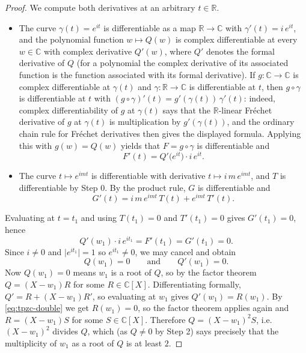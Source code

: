 \begin{proof}
We compute both derivatives at an arbitrary $t\in\mathbb{R}$.
\begin{itemize}
\item The curve $\gamma(t)=e^{it}$ is differentiable as a map
$\mathbb{R}\to\mathbb{C}$ with $\gamma'(t)=i\,e^{it}$, and the polynomial
function $w\mapsto Q(w)$ is complex differentiable at every $w\in\mathbb{C}$
with complex derivative $Q'(w)$, where $Q'$ denotes the formal derivative of
$Q$ (for a polynomial the complex derivative of its associated function is the
function associated with its formal derivative). If $g:\mathbb{C}\to\mathbb{C}$
is complex differentiable at $\gamma(t)$ and $\gamma:\mathbb{R}\to\mathbb{C}$ is
differentiable at $t$, then $g\circ\gamma$ is differentiable at $t$ with
$(g\circ\gamma)'(t)=g'(\gamma(t))\,\gamma'(t)$: indeed, complex
differentiability of $g$ at $\gamma(t)$ says that the $\mathbb{R}$-linear
Fr\'echet derivative of $g$ at $\gamma(t)$ is multiplication by $g'(\gamma(t))$,
and the ordinary chain rule for Fr\'echet derivatives then gives the displayed
formula. Applying this with $g(w)=Q(w)$ yields that $F=g\circ\gamma$ is
differentiable and
\[
  F'(t)=Q'\bigl(e^{it}\bigr)\cdot i\,e^{it}.
\]
\item The curve $t\mapsto e^{imt}$ is differentiable with derivative
$t\mapsto i\,m\,e^{imt}$, and $T$ is differentiable by Step 0. By the product
rule, $G$ is differentiable and
\[
  G'(t)=i\,m\,e^{imt}\,T(t)+e^{imt}\,T'(t).
\]
\end{itemize}
Evaluating at $t=t_1$ and using $T(t_1)=0$ and $T'(t_1)=0$ gives $G'(t_1)=0$,
hence
\[
  Q'(w_1)\cdot i\,e^{it_1}=F'(t_1)=G'(t_1)=0 .
\]
Since $i\ne0$ and $\lvert e^{it_1}\rvert=1$ so $e^{it_1}\ne0$, we may cancel and
obtain
\begin{equation}\label{eq:tpzc-double}
  Q(w_1)=0\qquad\text{and}\qquad Q'(w_1)=0 .
\end{equation}
Now $Q(w_1)=0$ means $w_1$ is a root of $Q$, so by the factor theorem
$Q=(X-w_1)R$ for some $R\in\mathbb{C}[X]$. Differentiating formally,
$Q'=R+(X-w_1)R'$, so evaluating at $w_1$ gives $Q'(w_1)=R(w_1)$. By
\eqref{eq:tpzc-double} we get $R(w_1)=0$, so the factor theorem applies again
and $R=(X-w_1)S$ for some $S\in\mathbb{C}[X]$. Therefore
$Q=(X-w_1)^2S$, i.e. $(X-w_1)^2$ divides $Q$, which (as $Q\ne0$ by Step 2) says
precisely that the multiplicity of $w_1$ as a root of $Q$ is at least $2$.


\end{proof}
